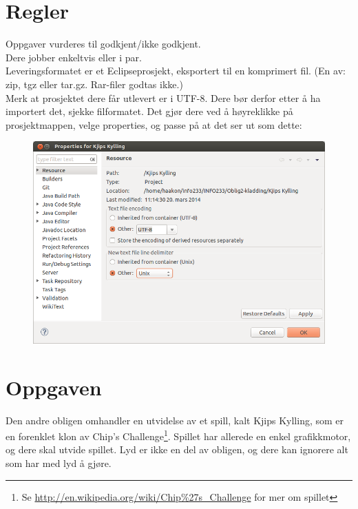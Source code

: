 \documentclass[norsk]{article}
\begin{document}
\blankpage

\section{Regler}
\label{sec:regler}
Oppgaver vurderes til godkjent/ikke godkjent.\\
Dere jobber enkeltvis eller i par.\\
Leveringsformatet er et Eclipseprosjekt, eksportert til en komprimert fil. (En av: zip, tgz eller tar.gz. Rar-filer godtas ikke.)\\ %
Merk at prosjektet dere får utlevert er i UTF-8. Dere bør derfor etter å ha importert det, sjekke filformatet. Det gjør dere ved å høyreklikke på prosjektmappen, velge properties, og passe på at det ser ut som dette:
\begin{figure}[h!]
  \centering
    \includegraphics[width=1\textwidth]{slik-ser-det-ut.png}
\end{figure}


\section{Oppgaven}
\label{sec:oppgaven}
Den andre obligen omhandler en utvidelse av et spill, kalt Kjips Kylling, som er en forenklet klon av Chip's Challenge\footnote{Se \url{http://en.wikipedia.org/wiki/Chip\%27s_Challenge} for mer om spillet}.
Spillet har allerede en enkel grafikkmotor, og dere skal utvide spillet.
Lyd er ikke en del av obligen, og dere kan ignorere alt som har med lyd å gjøre. %
\end{document}

